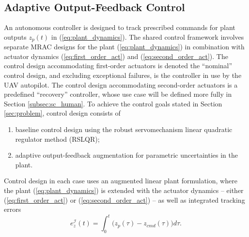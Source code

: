 \documentclass[english]{ifacconf}
\begin{document}

\subsection{Adaptive Output-Feedback Control}\label{subsec:sc_adaptive}
An autonomous controller is designed to track prescribed commands for plant outputs $z_p(t)$ in (\ref{eq:plant_dynamics}). The shared control framework involves separate MRAC designs for the plant (\ref{eq:plant_dynamics}) in combination with actuator dynamics (\ref{eq:first_order_act}) and (\ref{eq:second_order_act}). The control design accommodating first-order actuators is denoted the ``nominal'' control design, and excluding exceptional failures, is the controller in use by the UAV autopilot. The control design accommodating second-order actuators is a predefined ``recovery'' controller, whose use case will be defined more fully in Section \ref{subsec:sc_human}. To achieve the control goals stated in Section \ref{sec:problem}, control design consists of
\begin{enumerate}[label=(\roman*)]
	\item baseline control design using the robust servomechanism linear quadratic regulator method (RSLQR);
	\item adaptive output-feedback augmentation for parametric uncertainties in the plant.
\end{enumerate}

Control design in each case uses an augmented linear plant formulation, where the plant (\ref{eq:plant_dynamics}) is extended with the actuator dynamics -- either (\ref{eq:first_order_act}) or (\ref{eq:second_order_act}) -- as well as integrated tracking errors 
\begin{equation}
	e_z^{\mathcal{I}}(t) = \int_0^{t} \big( z_p(\tau) - z_{cmd}(\tau)\big) d\tau.
\end{equation}
\end{document}
